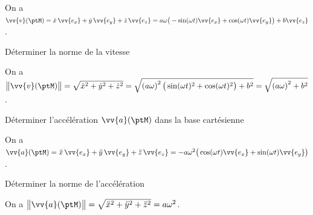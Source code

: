 \begin{corrige}
	On a $\vv{v}(\ptM)=\dot{x}\, \vv{e_x}+\dot{y}\, \vv{e_y}+\dot{z}\, \vv{e_z}=a\omega\big(-\sin(\omega t) \vv{e_x}+\cos(\omega t) \vv{e_y}\big)+b\vv{e_z}$.
\end{corrige}




\begin{enonce}
	Déterminer la norme de la vitesse
\end{enonce}


\begin{corrige}
	On a $\big\|\vv{v}(\ptM)\big\|=\sqrt{\dot{x}^2+\dot{y}^2+\dot{z}^2}=\sqrt{\left(a\omega\right)^2\big(\sin(\omega t)^2+\cos(\omega t)^2\big)+b^2}=\sqrt{\left(a\omega\right)^2+b^2}$.
\end{corrige}




\begin{enonce}
	Déterminer l'accélération $\vv{a}(\ptM)$ dans la base cartésienne
\end{enonce}


\begin{corrige}
	On a $\vv{a}(\ptM)=\ddot{x}\, \vv{e_x}+\ddot{y}\, \vv{e_y}+\ddot{z}\, \vv{e_z}=
	-a\omega^2\big(\cos(\omega t) \vv{e_x}+\sin(\omega t) \vv{e_y}\big)$.
\end{corrige}




\begin{enonce}
	Déterminer la norme de l'accélération  
\end{enonce}


\begin{corrige}
	On a $\big\|\vv{a}(\ptM)\big\|=\sqrt{\ddot{x}^2+\ddot{y}^2+\ddot{z}^2}=a\omega^2$.
\end{corrige}

